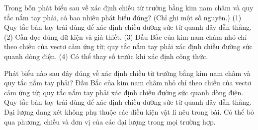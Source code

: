 \begin{ex}
Trong bốn phát biểu sau về xác định chiều từ trường bằng kim nam châm và quy tắc nắm tay phải, có bao nhiêu phát biểu đúng? (Chỉ ghi một số nguyên.) (1) Quy tắc bàn tay trái dùng để xác định chiều đường sức từ quanh dây dẫn thẳng. (2) Cần đọc đúng dữ kiện và giả thiết. (3) Đầu Bắc của kim nam châm nhỏ chỉ theo chiều của vectơ cảm ứng từ; quy tắc nắm tay phải xác định chiều đường sức quanh dòng điện. (4) Có thể thay số trước khi xác định công thức.
\end{ex}

\begin{ex}
Phát biểu nào sau đây đúng về xác định chiều từ trường bằng kim nam châm và quy tắc nắm tay phải?
\choice
{\True Đầu Bắc của kim nam châm nhỏ chỉ theo chiều của vectơ cảm ứng từ; quy tắc nắm tay phải xác định chiều đường sức quanh dòng điện.}
{Quy tắc bàn tay trái dùng để xác định chiều đường sức từ quanh dây dẫn thẳng.}
{Đại lượng đang xét không phụ thuộc các điều kiện vật lí nêu trong bài.}
{Có thể bỏ qua phương, chiều và đơn vị của các đại lượng trong mọi trường hợp.}
\end{ex}


